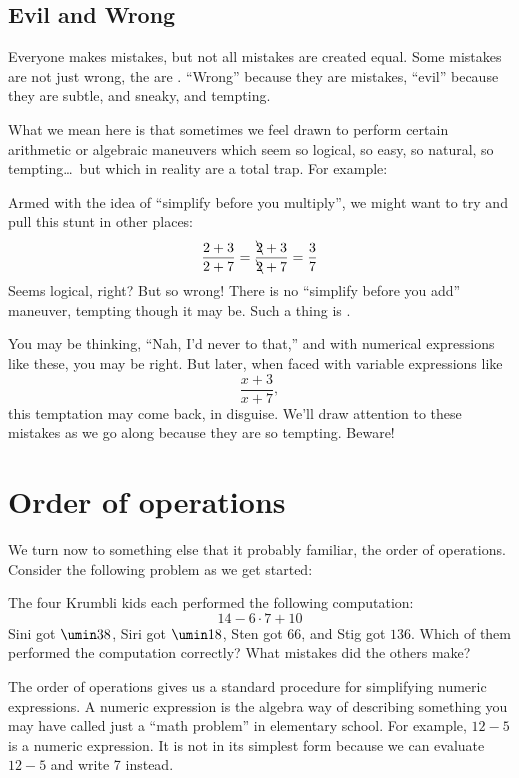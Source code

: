 \subsection{Evil and Wrong}

Everyone makes mistakes, but not all mistakes are created equal. Some mistakes are not just wrong, the are \evilandwrong. ``Wrong'' because they are mistakes, ``evil'' because they are subtle, and sneaky, and tempting.

What we mean here is that sometimes we feel drawn to perform certain arithmetic or algebraic maneuvers which seem so logical, so easy, so natural, so tempting\ldots\ but which in reality are a total trap. For example:

\begin{boxwarn}
Armed with the idea of ``simplify before you multiply'', we might want to try and pull this stunt in other places: \[\frac{2+3}{2+7} = \frac{\bcancel{2}+3}{\bcancel{2}+7} = \frac{3}{7}\]Seems logical, right? But so wrong! There is no ``simplify before you add'' maneuver, tempting though it may be. Such a thing is \evilandwrong.
\end{boxwarn}

You may be thinking, ``Nah, I'd never to that,'' and with numerical expressions like these, you may be right. But later, when faced with variable expressions like \[\frac{x+3}{x+7},\]
this temptation may come back, in disguise. We'll draw attention to these \evilandwrong{} mistakes as we go along because they are so tempting. Beware!


\section{Order of operations}
\label{sec:orderofops}

We turn now to something else that it probably familiar, the \gls{order of operations}. Consider the following problem as we get started:

\begin{boxexplore}
The four Krumbli kids each performed the following computation: \[14 - 6 \cdot 7 + 10\] Sini got $\umin38$,
Siri got $\umin18$,
Sten got $66$,
and Stig got $136$. Which of them performed the computation correctly? What mistakes did the others make?
\end{boxexplore}

The order of operations gives us a standard procedure for simplifying numeric expressions. A \gls{numeric expression} is the algebra way of describing something you may have called just a ``math problem'' in elementary school. For example, $12 - 5$ is a numeric expression. It is not in its simplest form because we can evaluate $12 - 5$ and write 7 instead.  

